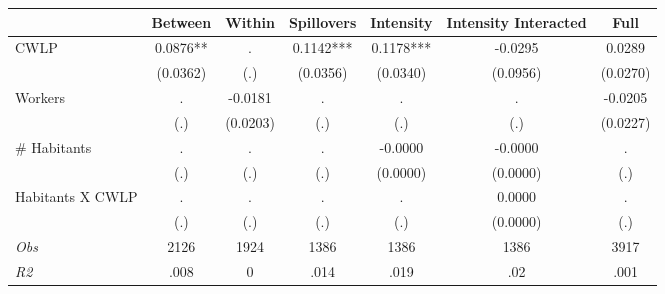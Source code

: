 \begin{tabular}{l*{6}{c}}\hline&\multicolumn{1}{c}{Between}&\multicolumn{1}{c}{Within}&\multicolumn{1}{c}{Spillovers}&\multicolumn{1}{c}{Intensity}&\multicolumn{1}{c}{Intensity Interacted}&\multicolumn{1}{c}{Full}\\ \hline 
CWLP & 0.0876** & . & 0.1142*** & 0.1178*** & -0.0295 & 0.0289 \\
 & (0.0362) & (.) & (0.0356) & (0.0340) & (0.0956) & (0.0270) \\
Workers & . & -0.0181 & . & . & . & -0.0205 \\
 & (.) & (0.0203) & (.) & (.) & (.) & (0.0227) \\
\# Habitants & . & . & . & -0.0000 & -0.0000 & . \\
 & (.) & (.) & (.) & (0.0000) & (0.0000) & (.) \\
Habitants X CWLP & . & . & . & . & 0.0000 & . \\
 & (.) & (.) & (.) & (.) & (0.0000) & (.) \\
\hline \textit{Obs} & 2126 & 1924 & 1386 & 1386 & 1386 & 3917 \\ \textit{R2} & .008 & 0 & .014 & .019 & .02 & .001 \\ \hline \end{tabular}
